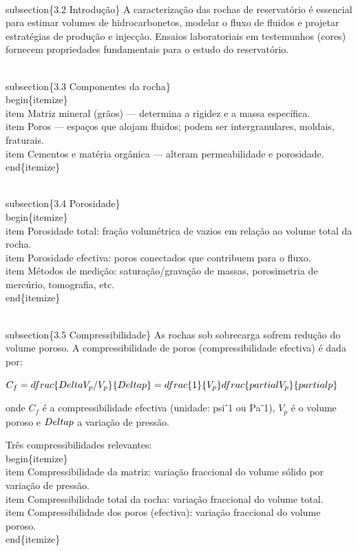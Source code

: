 \documentclass[11pt,a4paper]{article}
\begin{document}
\begin{enumerate}
{\\subsection\{3.2 Introdução\}
A caracterização das rochas de reservatório é essencial para estimar volumes de hidrocarbonetos, modelar o fluxo de fluidos e projetar estratégias de produção e injecção. Ensaios laboratoriais em testemunhos (cores) fornecem propriedades fundamentais para o estudo do reservatório.

\\subsection\{3.3 Componentes da rocha\}
\\begin\{itemize\}
\\item Matriz mineral (grãos) — determina a rigidez e a massa específica.
\\item Poros — espaços que alojam fluidos; podem ser intergranulares, moldais, fraturais.
\\item Cementos e matéria orgânica — alteram permeabilidade e porosidade.
\\end\{itemize\}

\\subsection\{3.4 Porosidade\}
\\begin\{itemize\}
\\item Porosidade total: fração volumétrica de vazios em relação ao volume total da rocha.
\\item Porosidade efectiva: poros conectados que contribuem para o fluxo.
\\item Métodos de medição: saturação/gravação de massas, porosimetria de mercúrio, tomografia, etc.
\\end\{itemize\}

\\subsection\{3.5 Compressibilidade\}
As rochas sob sobrecarga sofrem redução do volume poroso. A compressibilidade de poros (compressibilidade efectiva) é dada por:

$C_f = \\dfrac\{\\Delta V_p / V_p\}\{\\Delta p\} = \\dfrac\{1\}\{V_p\}\\dfrac\{\\partial V_p\}\{\\partial p\}$

onde $C_f$ é a compressibilidade efectiva (unidade: psi⁻1 ou Pa⁻1), $V_p$ é o volume poroso e $\\Delta p$ a variação de pressão.

Três compressibilidades relevantes:
\\begin\{itemize\}
\\item Compressibilidade da matriz: variação fraccional do volume sólido por variação de pressão.
\\item Compressibilidade total da rocha: variação fraccional do volume total.
\\item Compressibilidade dos poros (efectiva): variação fraccional do volume poroso.
\\end\{itemize\}

}
\end{enumerate}
\end{document}
